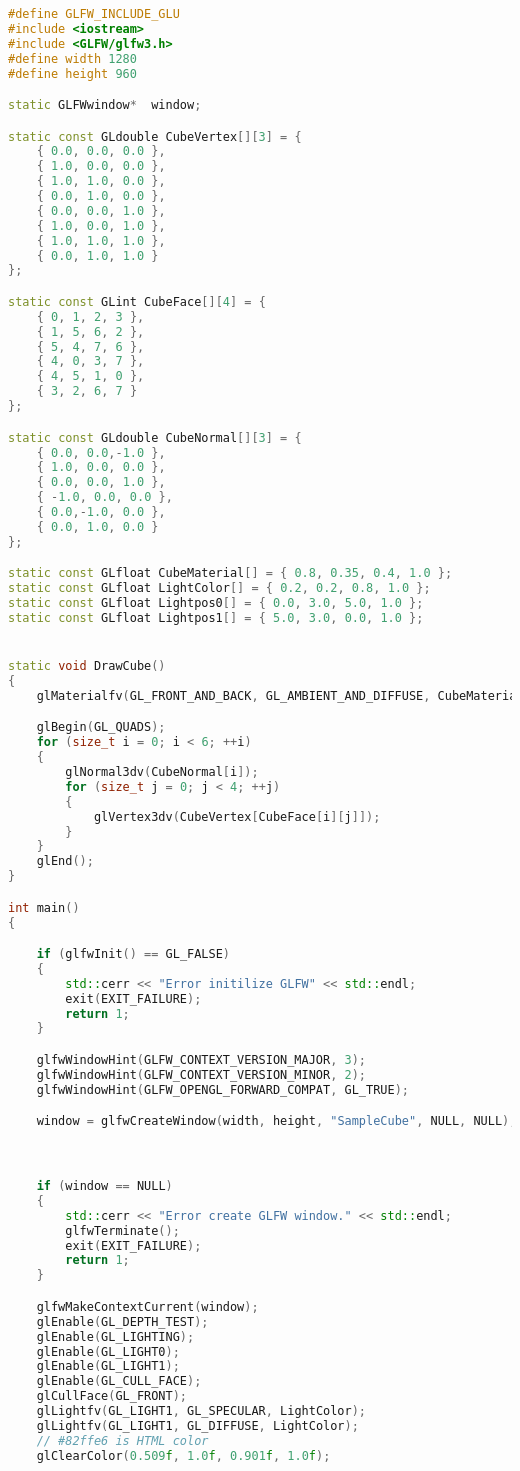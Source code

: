 \documentclass[12pt,a4paper,titlepage]{jsarticle}
\begin{document}
\begin{lstlisting}[language=C++]
#define GLFW_INCLUDE_GLU
#include <iostream>
#include <GLFW/glfw3.h>
#define width 1280
#define height 960

static GLFWwindow*  window;

static const GLdouble CubeVertex[][3] = {
	{ 0.0, 0.0, 0.0 },
	{ 1.0, 0.0, 0.0 },
	{ 1.0, 1.0, 0.0 },
	{ 0.0, 1.0, 0.0 },
	{ 0.0, 0.0, 1.0 },
	{ 1.0, 0.0, 1.0 },
	{ 1.0, 1.0, 1.0 },
	{ 0.0, 1.0, 1.0 }
};

static const GLint CubeFace[][4] = {
	{ 0, 1, 2, 3 },
	{ 1, 5, 6, 2 },
	{ 5, 4, 7, 6 },
	{ 4, 0, 3, 7 },
	{ 4, 5, 1, 0 },
	{ 3, 2, 6, 7 }
};

static const GLdouble CubeNormal[][3] = {
	{ 0.0, 0.0,-1.0 },
	{ 1.0, 0.0, 0.0 },
	{ 0.0, 0.0, 1.0 },
	{ -1.0, 0.0, 0.0 },
	{ 0.0,-1.0, 0.0 },
	{ 0.0, 1.0, 0.0 }
};

static const GLfloat CubeMaterial[] = { 0.8, 0.35, 0.4, 1.0 };
static const GLfloat LightColor[] = { 0.2, 0.2, 0.8, 1.0 };
static const GLfloat Lightpos0[] = { 0.0, 3.0, 5.0, 1.0 };
static const GLfloat Lightpos1[] = { 5.0, 3.0, 0.0, 1.0 };


static void DrawCube()
{
	glMaterialfv(GL_FRONT_AND_BACK, GL_AMBIENT_AND_DIFFUSE, CubeMaterial);

	glBegin(GL_QUADS);
	for (size_t i = 0; i < 6; ++i)
	{
		glNormal3dv(CubeNormal[i]);
		for (size_t j = 0; j < 4; ++j)
		{
			glVertex3dv(CubeVertex[CubeFace[i][j]]);
		}
	}
	glEnd();
}

int main()
{

	if (glfwInit() == GL_FALSE)
	{
		std::cerr << "Error initilize GLFW" << std::endl;
		exit(EXIT_FAILURE);
		return 1;
	}

	glfwWindowHint(GLFW_CONTEXT_VERSION_MAJOR, 3);
	glfwWindowHint(GLFW_CONTEXT_VERSION_MINOR, 2);
	glfwWindowHint(GLFW_OPENGL_FORWARD_COMPAT, GL_TRUE);

	window = glfwCreateWindow(width, height, "SampleCube", NULL, NULL);



	if (window == NULL)
	{
		std::cerr << "Error create GLFW window." << std::endl;
		glfwTerminate();
		exit(EXIT_FAILURE);
		return 1;
	}

	glfwMakeContextCurrent(window);
	glEnable(GL_DEPTH_TEST);
	glEnable(GL_LIGHTING);
	glEnable(GL_LIGHT0);
	glEnable(GL_LIGHT1);
	glEnable(GL_CULL_FACE);
	glCullFace(GL_FRONT);
	glLightfv(GL_LIGHT1, GL_SPECULAR, LightColor);
	glLightfv(GL_LIGHT1, GL_DIFFUSE, LightColor);
	// #82ffe6 is HTML color
	glClearColor(0.509f, 1.0f, 0.901f, 1.0f);


\end{lstlisting}
\end{document}

